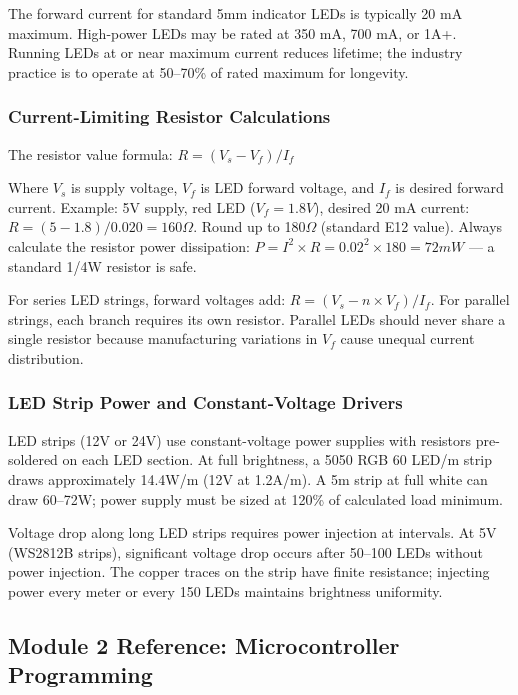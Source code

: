 \documentclass[11pt,letterpaper]{article}
\begin{document}
The forward current for standard 5mm indicator LEDs is typically 20 mA maximum. High-power LEDs may be rated at 350 mA, 700 mA, or 1A+. Running LEDs at or near maximum current reduces lifetime; the industry practice is to operate at 50--70\% of rated maximum for longevity.

\subsubsection{Current-Limiting Resistor Calculations}

The resistor value formula: $R = (V_s - V_f) / I_f$

Where $V_s$ is supply voltage, $V_f$ is LED forward voltage, and $I_f$ is desired forward current. Example: 5V supply, red LED ($V_f = 1.8V$), desired 20 mA current: $R = (5 - 1.8) / 0.020 = 160\Omega$. Round up to 180$\Omega$ (standard E12 value). Always calculate the resistor power dissipation: $P = I^2 \times R = 0.02^2 \times 180 = 72 mW$ --- a standard 1/4W resistor is safe.

For series LED strings, forward voltages add: $R = (V_s - n \times V_f) / I_f$. For parallel strings, each branch requires its own resistor. Parallel LEDs should never share a single resistor because manufacturing variations in $V_f$ cause unequal current distribution.

\subsubsection{LED Strip Power and Constant-Voltage Drivers}

LED strips (12V or 24V) use constant-voltage power supplies with resistors pre-soldered on each LED section. At full brightness, a 5050 RGB 60 LED/m strip draws approximately 14.4W/m (12V at 1.2A/m). A 5m strip at full white can draw 60--72W; power supply must be sized at 120\% of calculated load minimum.

Voltage drop along long LED strips requires power injection at intervals. At 5V (WS2812B strips), significant voltage drop occurs after 50--100 LEDs without power injection. The copper traces on the strip have finite resistance; injecting power every meter or every 150 LEDs maintains brightness uniformity.

\subsection{Module 2 Reference: Microcontroller Programming}
\end{document}
